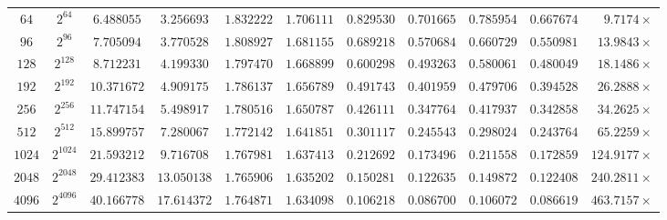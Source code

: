 \documentclass[11pt,reqno]{amsart}
\theoremstyle{definition}
\theoremstyle{remark}
\begin{document}
\begin{table}[htbp]
{\begin{tabular}{ccccccccccr}
    $64$   & $2^{64}$   & $6.488055$  & $3.256693$  & $\mathbf{1.832222}$ & $\mathbf{1.706111}$ & $\mathbf{0.829530}$ & $\mathbf{0.701665}$ & $\mathbf{0.785954}$ & $\mathbf{0.667674}$ & $9.7174\times$ \\
    $96$   & $2^{96}$   & $7.705094$  & $3.770528$  & $\mathbf{1.808927}$ & $\mathbf{1.681155}$ & $\mathbf{0.689218}$ & $\mathbf{0.570684}$ & $\mathbf{0.660729}$ & $\mathbf{0.550981}$ & $13.9843\times$ \\
    $128$  & $2^{128}$  & $8.712231$  & $4.199330$  & $\mathbf{1.797470}$ & $\mathbf{1.668899}$ & $\mathbf{0.600298}$ & $\mathbf{0.493263}$ & $\mathbf{0.580061}$ & $\mathbf{0.480049}$ & $18.1486\times$ \\
    $192$  & $2^{192}$  & $10.371672$ & $4.909175$  & $\mathbf{1.786137}$ & $\mathbf{1.656789}$ & $\mathbf{0.491743}$ & $\mathbf{0.401959}$ & $\mathbf{0.479706}$ & $\mathbf{0.394528}$ & $26.2888\times$ \\
    $256$  & $2^{256}$  & $11.747154$ & $5.498917$  & $\mathbf{1.780516}$ & $\mathbf{1.650787}$ & $\mathbf{0.426111}$ & $\mathbf{0.347764}$ & $\mathbf{0.417937}$ & $\mathbf{0.342858}$ & $34.2625\times$ \\
    $512$  & $2^{512}$  & $15.899757$ & $7.280067$  & $\mathbf{1.772142}$ & $\mathbf{1.641851}$ & $\mathbf{0.301117}$ & $\mathbf{0.245543}$ & $\mathbf{0.298024}$ & $\mathbf{0.243764}$ & $65.2259\times$ \\
    $1024$ & $2^{1024}$ & $21.593212$ & $9.716708$  & $\mathbf{1.767981}$ & $\mathbf{1.637413}$ & $\mathbf{0.212692}$ & $\mathbf{0.173496}$ & $\mathbf{0.211558}$ & $\mathbf{0.172859}$ & $124.9177\times$ \\
    $2048$ & $2^{2048}$ & $29.412383$ & $13.050138$ & $\mathbf{1.765906}$ & $\mathbf{1.635202}$ & $\mathbf{0.150281}$ & $\mathbf{0.122635}$ & $\mathbf{0.149872}$ & $\mathbf{0.122408}$ & $240.2811\times$ \\
    $4096$ & $2^{4096}$ & $40.166778$ & $17.614372$ & $\mathbf{1.764871}$ & $\mathbf{1.634098}$ & $\mathbf{0.106218}$ & $\mathbf{0.086700}$ & $\mathbf{0.106072}$ & $\mathbf{0.086619}$ & $\mathbf{463.7157\times}$ \\
    \bottomrule
  \end{tabular}%
  }
\end{table}
\end{document}
